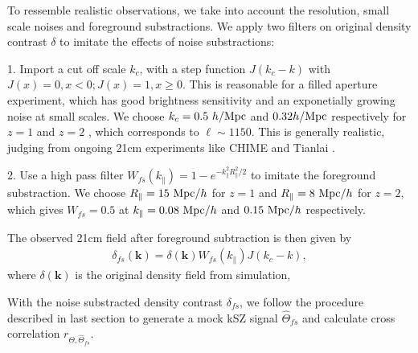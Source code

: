To ressemble realistic observations, we take into account the resolution, small scale noises and foreground substractions. 
We apply two filters on original density contrast $\delta$ to imitate the effects of noise substractions:

1. Import a cut off scale $k_c$, 
with a step function $J(k_c-k)$ with $J(x)=0, x<0; J(x)=1, x\geqslant0$.
This is reasonable for a filled aperture experiment, which
has good brightness sensitivity and an exponetially growing noise at small 
scales.
We choose $k_c=0.5\ h/\mathrm{Mpc}$ and $0.32 h/\mathrm{Mpc}$ respectively for $z=1$ and $z=2$ , which corresponds
to $\ell\sim1150$. 
This is generally realistic, judging from ongoing 21cm experiments like
CHIME \cite{2014SPIE.9145E..22B}\cite{2014SPIE.9145E..4VN}
and Tianlai \cite{2012IJMPS..12..256C}\cite{2015ApJ...798...40X}.

2. Use a high pass filter $W_{fs}(k_\parallel)=1-e^{-k_\parallel^2R_\parallel^2/2}$ to imitate the foreground substraction. 
We choose 
$R_\parallel=15\ \mathrm{Mpc}/h$ for $z=1$ and $R_\parallel=8\ \mathrm{Mpc}/h$ for $z=2$, which gives
$W_{fs}=0.5$ at
$k_\parallel=0.08\ \mathrm{Mpc}/h$ and $0.15\ \mathrm{Mpc}/h$ respectively. 

The observed 21cm field after foreground subtraction is then given by 
\begin{eqnarray}
\label{eq:fs}
\delta_{fs}(\bm{k})=\delta(\bm{k})W_{fs}(k_\parallel)J(k_c-k),
\end{eqnarray}
where $\delta(\bm{k})$ is the original density field from simulation, 

With the noise substracted density contrast $\delta_{fs}$, we follow the procedure described in last section to generate a mock kSZ signal $\hat \Theta_{fs}$  
and calculate cross correlation $r_{\Theta,\hat\Theta_{fs}}$.
